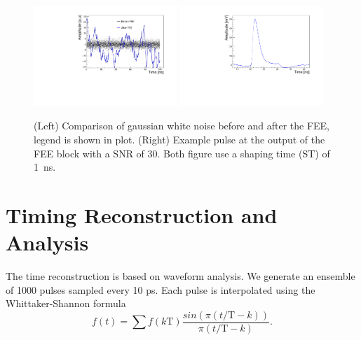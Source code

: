 \documentclass[preprint,1p]{elsarticle}
\begin{document}
\begin{figure}[htbp]
  \centering
  \includegraphics[width=0.48\textwidth]{figs/noise_vs_shaped_noise.pdf} \hfill
  \includegraphics[width=0.48\textwidth]{figs/lgad_pre_rad_st_1ns_snr_30.pdf}
  \caption{(Left) Comparison of gaussian white noise before and after the FEE, legend is shown in plot.
  (Right) Example pulse at the output of the FEE block with a SNR of 30. Both figure use a shaping time (ST) of 1~\si{ns}.}
  \label{fig:noise}
\end{figure}

\section{Timing Reconstruction and Analysis}\label{sec:timing_and_analysis}
The time reconstruction is based on waveform analysis. We generate an ensemble of 1000 pulses sampled every 10 ps.
Each pulse is interpolated using the Whittaker-Shannon formula~\cite{whittaker_1915,shannon_1935}
\begin{equation}\label{eq:WS}
  f(t) = \sum f(k\mathrm{T})\frac{sin(\pi(t/\mathrm{T} - k))}{\pi(t/\mathrm{T} - k)}.
\end{equation}
\end{document}
